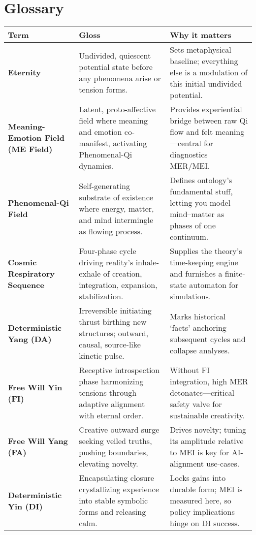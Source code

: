 \documentclass[11pt, a4paper]{article}
\begin{document}
\section*{Glossary}

\begin{tabularx}{\textwidth}{|l|X|X|}
\hline
\textbf{Term} & \textbf{Gloss} & \textbf{Why it matters} \\
\hline
\textbf{Eternity} & Undivided, quiescent potential state before any phenomena arise or tension forms. & Sets metaphysical baseline; everything else is a modulation of this initial undivided potential. \\
\hline
\textbf{Meaning-Emotion Field (ME Field)} & Latent, proto-affective field where meaning and emotion co-manifest, activating Phenomenal-Qi dynamics. & Provides experiential bridge between raw Qi flow and felt meaning—central for diagnostics MER/MEI. \\
\hline
\textbf{Phenomenal-Qi Field} & Self-generating substrate of existence where energy, matter, and mind intermingle as flowing process. & Defines ontology’s fundamental stuff, letting you model mind–matter as phases of one continuum. \\
\hline
\textbf{Cosmic Respiratory Sequence} & Four-phase cycle driving reality’s inhale-exhale of creation, integration, expansion, stabilization. & Supplies the theory’s time-keeping engine and furnishes a finite-state automaton for simulations. \\
\hline
\textbf{Deterministic Yang (DA)} & Irreversible initiating thrust birthing new structures; outward, causal, source-like kinetic pulse. & Marks historical ‘facts’ anchoring subsequent cycles and collapse analyses. \\
\hline
\textbf{Free Will Yin (FI)} & Receptive introspection phase harmonizing tensions through adaptive alignment with eternal order. & Without FI integration, high MER detonates—critical safety valve for sustainable creativity. \\
\hline
\textbf{Free Will Yang (FA)} & Creative outward surge seeking veiled truths, pushing boundaries, elevating novelty. & Drives novelty; tuning its amplitude relative to MEI is key for AI-alignment use-cases. \\
\hline
\textbf{Deterministic Yin (DI)} & Encapsulating closure crystallizing experience into stable symbolic forms and releasing calm. & Locks gains into durable form; MEI is measured here, so policy implications hinge on DI success. \\
\hline

\end{tabularx}
\end{document}
